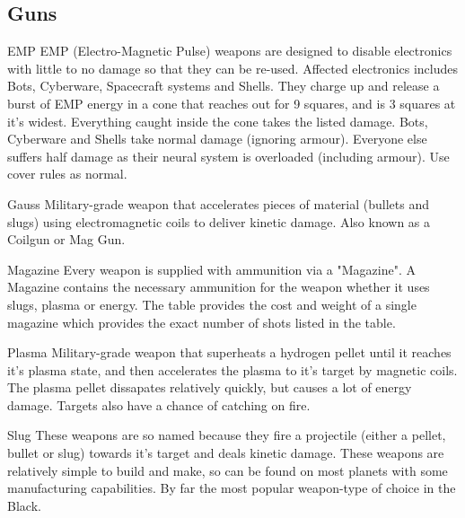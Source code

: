 \subsection{Guns}

\begin{multicols}{2}

\begin{genericsection}{EMP}
EMP (Electro-Magnetic Pulse) weapons are designed to disable electronics with little to no damage so that they can be re-used. Affected electronics includes Bots, Cyberware, Spacecraft systems and Shells. They charge up and release a burst of EMP energy in a cone that reaches out for 9 squares, and is 3 squares at it's widest. Everything caught inside the cone takes the listed damage. Bots, Cyberware and Shells take normal damage (ignoring armour). Everyone else suffers half damage as their neural system is overloaded (including armour). Use cover rules as normal.
\end{genericsection}

\begin{genericsection}{Gauss}
Military-grade weapon that accelerates pieces of material (bullets and slugs) using electromagnetic coils to deliver kinetic damage. Also known as a Coilgun or Mag Gun.
\end{genericsection}

\begin{genericsection}{Magazine}
Every weapon is supplied with ammunition via a "Magazine". A Magazine contains the necessary ammunition for the weapon whether it uses slugs, plasma or energy. The table provides the cost and weight of a single magazine which provides the exact number of shots listed in the table.
\end{genericsection}

\begin{genericsection}{Plasma}
Military-grade weapon that superheats a hydrogen pellet until it reaches it's plasma state, and then accelerates the plasma to it's target by magnetic coils. The plasma pellet dissapates relatively quickly, but causes a lot of energy damage. Targets also have a chance of catching on fire.
\end{genericsection}

\begin{genericsection}{Slug}
These weapons are so named because they fire a projectile (either a pellet, bullet or slug) towards it's target and deals kinetic damage. These weapons are relatively simple to build and make, so can be found on most planets with some manufacturing capabilities. By far the most popular weapon-type of choice in the Black.
\end{genericsection}


\end{multicols}
